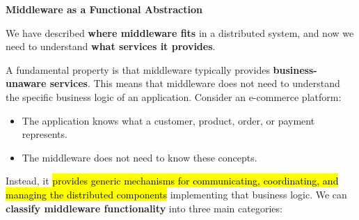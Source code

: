 \newpage

\begin{flushleft}
    \textcolor{Green3}{ \textbf{Middleware as a Functional Abstraction}}
\end{flushleft}
We have described \textbf{where middleware fits} in a distributed system, and now we need to understand \textbf{what services it provides}.

\highspace
A fundamental property is that middleware typically provides \textbf{business-\break unaware services}. This means that middleware does not need to understand the specific business logic of an application. Consider an e-commerce platform:
\begin{itemize}
    \item The application knows what a customer, product, order, or payment represents.
    \item The middleware does not need to know these concepts.
\end{itemize}
Instead, it \hl{provides generic mechanisms for communicating, coordinating, and managing the distributed components} implementing that business logic.
We can \textbf{classify middleware functionality} into three main categories:
